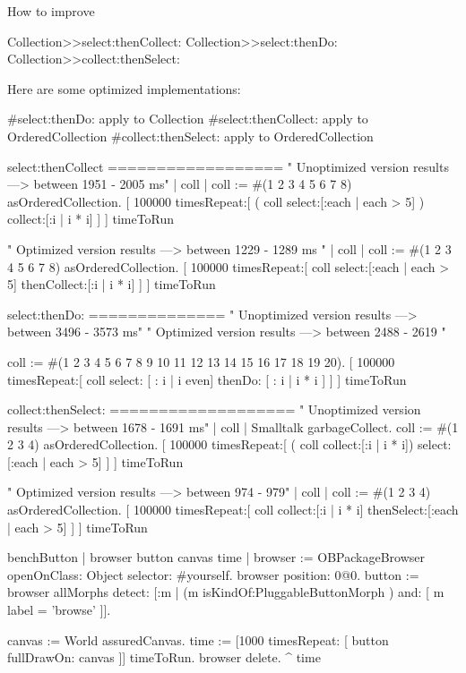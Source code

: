 \documentclass[a4paper,10pt,twoside]{book}
\begin{document}
How to improve 
\begin{code}{}
	Collection>>select:thenCollect:
	Collection>>select:thenDo:
	Collection>>collect:thenSelect:
	
	Here are some optimized implementations: 

	#select:thenDo: apply to Collection
	#select:thenCollect: apply to OrderedCollection
	#collect:thenSelect: apply to OrderedCollection

	select:thenCollect
	==================
	" Unoptimized version results ---> between 1951 - 2005 ms"
	| coll |
	coll := #(1 2 3 4 5 6 7 8) asOrderedCollection. 
	[ 100000 timesRepeat:[
	   ( coll select:[:each | each > 5] ) collect:[:i | i * i]
	  ]
	] timeToRun

	" Optimized version results ---> between 1229 - 1289 ms "
	| coll |
	coll := #(1 2 3 4 5 6 7 8) asOrderedCollection. 
	[ 100000 timesRepeat:[
	    coll select:[:each | each > 5] thenCollect:[:i | i * i]
	  ]
	] timeToRun

	select:thenDo:
	==============
	" Unoptimized version results ---> between 3496 - 3573 ms"
	" Optimized version results ---> between 2488 - 2619 "

	coll := #(1 2 3 4 5 6 7 8 9 10 11 12 13 14 15 16 17 18 19 20).
	[ 100000 timesRepeat:[
	        coll select: [ : i | i even] thenDo: [ : i | i * i ]
	     ]
	] timeToRun  

	collect:thenSelect:
	===================
	" Unoptimized version results ---> between 1678 - 1691 ms"
	| coll |
	Smalltalk garbageCollect.
	coll := #(1 2 3 4) asOrderedCollection.   
	[ 100000 timesRepeat:[
	   ( coll collect:[:i | i * i]) select:[:each | each > 5]
	   ]
	] timeToRun  

	" Optimized version results ---> between 974 - 979"
	| coll |
	coll := #(1 2 3 4) asOrderedCollection.   
	[ 100000 timesRepeat:[
	    coll collect:[:i | i * i] thenSelect:[:each | each > 5]
	   ]
	] timeToRun

	
	
	
	
	
	
benchButton
	| browser button canvas time |
	browser := OBPackageBrowser openOnClass: Object selector: #yourself.
	browser position: 0@0.
	button := browser allMorphs detect: [:m | (m
	isKindOf:PluggableButtonMorph ) and: [ m label = 'browse' ]].

	canvas := World assuredCanvas.
	time := [1000 timesRepeat: [ button fullDrawOn: canvas ]] timeToRun.
	browser delete.
	^ time
\end{code}
\end{document}
